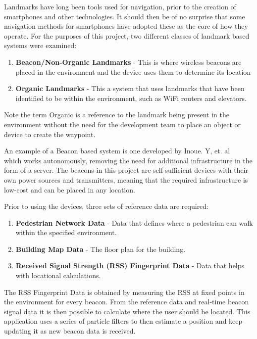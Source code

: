 \documentclass[12pt,a4paper]{report}
\begin{document}
Landmarks have long been tools used for navigation, prior to the creation of smartphones and other technologies. It should then be of no surprise that some navigation methods for smartphones have adopted these as the core of how they operate. For the purposes of this project, two different classes of landmark based systems were examined:

\begin{enumerate}
	\item \textbf{Beacon/Non-Organic Landmarks} - This is where wireless beacons are placed in the environment and the device uses them to determine its location
	\item \textbf{Organic Landmarks} - This a system that uses landmarks that have been identified to be within the environment, such as WiFi routers and elevators.
\end{enumerate}

Note the term Organic is a reference to the landmark being present in the environment without the need for the development team to place an object or device to create the waypoint.

An example of a Beacon based system is one developed by Inoue. Y, et. al ~\cite{Inoue2009} which works autonomously, removing the need for additional infrastructure in the form of a server. The beacons in this project are self-sufficient devices with their own power sources and transmitters, meaning that the required infrastructure is low-cost and can be placed in any location.

Prior to using the devices, three sets of reference data are required:

\begin{enumerate}
	\item \textbf{Pedestrian Network Data} - Data that defines where a pedestrian can walk within the specified environment.
	\item \textbf{Building Map Data} - The floor plan for the building.
	\item \textbf{Received Signal Strength (RSS) Fingerprint Data} - Data that helps with locational calculations.
\end{enumerate}

The RSS Fingerprint Data is obtained by measuring the RSS at fixed points in the environment for every beacon. From the reference data and real-time beacon signal data it is then possible to calculate where the user should be located. This application uses a series of particle filters to then estimate a position and keep updating it as new beacon data is received.
\end{document}
